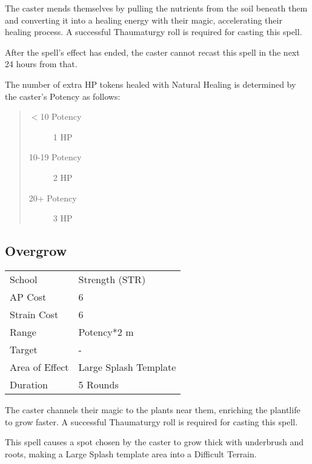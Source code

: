 \documentclass[11pt,a4paper,twocolumn]{book}
\begin{document}
\medskip

The caster mends themselves by pulling the nutrients from the soil beneath them and converting it into a healing energy with their magic, accelerating their healing process. A successful Thaumaturgy roll is required for casting this spell.

After the spell's effect has ended, the caster cannot recast this spell in the next 24 hours from that.

\bigskip

The number of extra HP tokens healed with Natural Healing is determined by the caster's Potency as follows:
\begin{quote}
	\begin{description}
		\item[$<$10 Potency] 	1 HP
		\item[10-19 Potency] 	2 HP
		\item[20+ Potency] 	3 HP
	\end{description}
\end{quote}


\vfill

\subsection*{Overgrow}
{
	\begin{tabu} to 75mm{| X[l,4] | X[l,7] |}
		\hline
		School         & Strength (STR)        \\
		AP Cost        & 6                     \\
		Strain Cost    & 6                     \\
		Range          & Potency*2 m           \\
		Target         & -                     \\
		Area of Effect & Large Splash Template \\
		Duration       & 5 Rounds              \\ \hline
	\end{tabu}
	
}

\medskip

The caster channels their magic to the plants near them, enriching the plantlife to grow faster. A successful Thaumaturgy roll is required for casting this spell.

This spell causes a spot chosen by the caster to grow thick with underbrush and roots, making a Large Splash template area into a Difficult Terrain.
\end{document}
